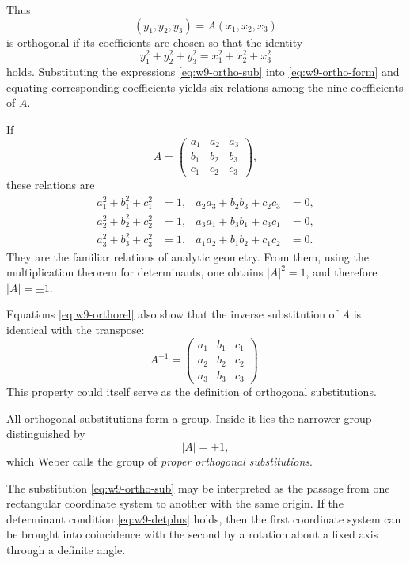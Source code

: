 \documentclass[11pt]{article}
\begin{document}
Thus
\begin{equation}\label{eq:w9-ortho-sub}
 (y_1,y_2,y_3)=A(x_1,x_2,x_3)
\end{equation}
is orthogonal if its coefficients are chosen so that the identity
\begin{equation}\label{eq:w9-ortho-form}
 y_1^2+y_2^2+y_3^2=x_1^2+x_2^2+x_3^2
\end{equation}
holds.  Substituting the expressions \eqref{eq:w9-ortho-sub} into \eqref{eq:w9-ortho-form} and equating corresponding coefficients yields six relations among the nine coefficients of $A$.

If
\begin{equation}\label{eq:w9-Aabc}
 A=\begin{pmatrix}
 a_1&a_2&a_3\\
 b_1&b_2&b_3\\
 c_1&c_2&c_3
 \end{pmatrix},
\end{equation}
these relations are
\begin{equation}\label{eq:w9-orthorel}
\begin{aligned}
 a_1^2+b_1^2+c_1^2&=1,&
 a_2a_3+b_2b_3+c_2c_3&=0,\\
 a_2^2+b_2^2+c_2^2&=1,&
 a_3a_1+b_3b_1+c_3c_1&=0,\\
 a_3^2+b_3^2+c_3^2&=1,&
 a_1a_2+b_1b_2+c_1c_2&=0.
\end{aligned}
\end{equation}
They are the familiar relations of analytic geometry.  From them, using the multiplication theorem for determinants, one obtains $|A|^2=1$, and therefore $|A|=\pm1$.

Equations \eqref{eq:w9-orthorel} also show that the inverse substitution of $A$ is identical with the transpose:
\[
 A^{-1}=\begin{pmatrix}
 a_1&b_1&c_1\\
 a_2&b_2&c_2\\
 a_3&b_3&c_3
 \end{pmatrix}.
\]
This property could itself serve as the definition of orthogonal substitutions.

All orthogonal substitutions form a group.  Inside it lies the narrower group distinguished by
\begin{equation}\label{eq:w9-detplus}
 |A|=+1,
\end{equation}
which Weber calls the group of \emph{proper orthogonal substitutions}.

The substitution \eqref{eq:w9-ortho-sub} may be interpreted as the passage from one rectangular coordinate system to another with the same origin.  If the determinant condition \eqref{eq:w9-detplus} holds, then the first coordinate system can be brought into coincidence with the second by a rotation about a fixed axis through a definite angle.
\end{document}
